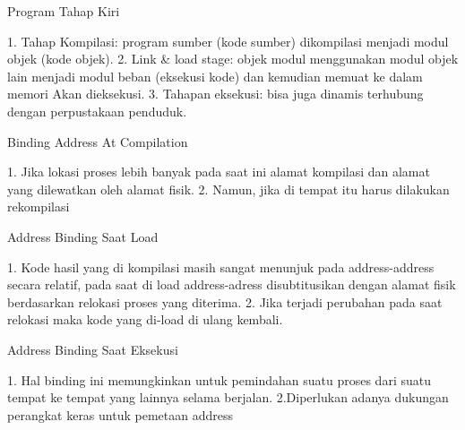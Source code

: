 Program Tahap Kiri

1. Tahap Kompilasi: program sumber (kode sumber) dikompilasi menjadi
modul objek (kode objek).
2. Link & load stage: objek modul menggunakan modul objek lain
menjadi modul beban (eksekusi kode) dan kemudian memuat ke dalam memori
Akan dieksekusi.
3. Tahapan eksekusi: bisa juga dinamis
terhubung dengan perpustakaan penduduk.

Binding Address At Compilation

1. Jika lokasi proses lebih banyak pada saat ini
alamat kompilasi dan alamat yang dilewatkan oleh alamat
fisik.
2. Namun, jika di tempat itu harus dilakukan rekompilasi

Address Binding Saat Load

1. Kode hasil yang di kompilasi masih sangat menunjuk pada address-address secara relatif, pada saat di load address-adress disubtitusikan dengan alamat fisik berdasarkan relokasi proses yang diterima.
2. Jika terjadi perubahan pada saat relokasi maka kode yang di-load di ulang kembali.

Address Binding Saat Eksekusi

1. Hal binding ini memungkinkan untuk pemindahan suatu proses dari suatu tempat ke tempat yang lainnya selama berjalan.
2.Diperlukan adanya dukungan perangkat keras untuk pemetaan address


